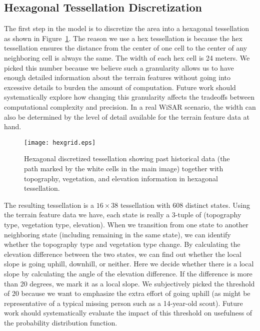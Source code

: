 \documentclass[smallextended,natbib]{svjour3}
\begin{document}
\subsection{Hexagonal Tessellation Discretization}
\label{sec:3.3}

The first step in the model is to discretize the area into a hexagonal tessellation as shown in Figure~\ref{hexgrid}. The reason we use a hex tessellation is because the hex tessellation ensures the distance from the center of one cell to the center of any neighboring cell is always the same. The width of each hex cell is 24 meters. We picked this number because we believe such a granularity allows us to have enough detailed information about the terrain features without going into excessive details to burden the amount of computation. Future work should systematically explore how changing this granularity affects the tradeoffs between computational complexity and precision. In a real WiSAR scenario, the width can also be determined by the level of detail available for the terrain feature data at hand.

\begin{figure}
\centering
\texttt{[image: hexgrid.eps]}
\caption[Hexagonal discretized tessellation showing past historical data]{Hexagonal discretized tessellation showing past historical data (the path marked by the white cells in the main image) together with topography, vegetation, and elevation information in hexagonal tessellation.}
\label{hexgrid}
\end{figure}

The resulting tessellation is a $16 \times 38$ tessellation with 608 distinct states. Using the terrain feature data we have, each state is really a 3-tuple of (topography type, vegetation type, elevation). When we transition from one state to another neighboring state (including remaining in the same state), we can identify whether the topography type and vegetation type change. By calculating the elevation difference between the two states, we can find out whether the local slope is going uphill, downhill, or neither. Here we decide whether there is a local slope by calculating the angle of the elevation difference. If the difference is more than 20 degrees, we mark it as a local slope. We subjectively picked the threshold of 20 because we want to emphasize the extra effort of going uphill (as might be representative of a typical missing person such as a 14-year-old scout). Future work should systematically evaluate the impact of this threshold on usefulness of the probability distribution function.
\end{document}
